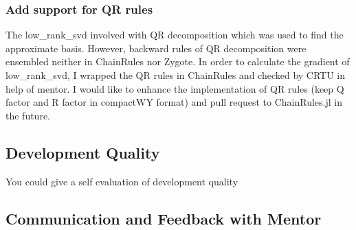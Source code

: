 \subsubsection{Add support for QR rules}
The low\_rank\_svd involved with QR decomposition which was used to find the approximate basis. 
However, backward rules of QR decomposition were ensembled neither in ChainRules nor Zygote. In order to 
calculate the gradient of low\_rank\_svd, I wrapped the QR rules in ChainRules and checked by CRTU in help of mentor. 
I would like to enhance the implementation of QR rules (keep Q factor and R factor in compactWY format) and pull request to 
ChainRules.jl in the future. 
\subsection{Development Quality}
You could give a self evaluation of development quality
\subsection{Communication and Feedback with Mentor}

